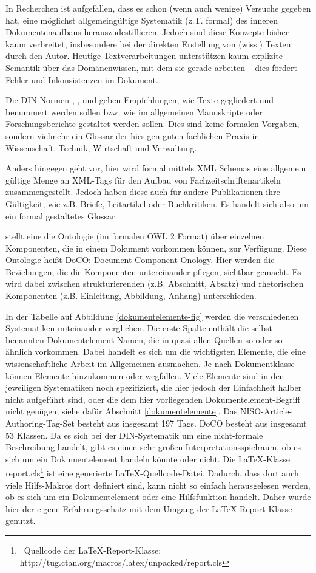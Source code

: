  
In Recherchen ist aufgefallen, dass es schon (wenn auch wenige) Versuche gegeben hat, eine möglichst allgemeingültige Systematik (z.T. formal) des inneren Dokumentenaufbaus herauszudestillieren. Jedoch sind diese Konzepte bisher kaum verbreitet, insbesondere bei der direkten Erstellung von (wiss.) Texten durch den Autor. Heutige Textverarbeitungen unterstützen kaum explizite Semantik über das Domänenwissen, mit dem sie gerade arbeiten -- dies fördert Fehler und Inkonsistenzen im Dokument.

 
Die DIN-Normen \citep{DIN1421}, \citep{DIN1422-1}, \citep{DIN1422-3} und \citep{DIN1422-4} geben Empfehlungen, wie Texte gegliedert und benummert werden sollen bzw. wie im allgemeinen Manuskripte oder Forschungsberichte gestaltet werden sollen. Dies sind keine formalen Vorgaben, sondern vielmehr ein Glossar der hiesigen guten fachlichen Praxis in Wissenschaft, Technik, Wirtschaft und Verwaltung.

 
Anders hingegen geht \citep{NISO} vor, hier wird formal mittels XML Schemas eine allgemein gültige Menge an XML-Tags für den Aufbau von Fachzeitschriftenartikeln zusammengestellt. Jedoch haben diese auch für andere Publikationen ihre Gültigkeit, wie z.B. Briefe, Leitartikel oder Buchkritiken. Es handelt sich also um ein formal gestaltetes Glossar.

 
\citep{Peroni} stellt eine die Ontologie (im formalen OWL 2 Format) über einzelnen Komponenten, die in einem Dokument vorkommen können, zur Verfügung. Diese Ontologie heißt DoCO: Document Component Onology. Hier werden die Beziehungen, die die Komponenten untereinander pflegen, sichtbar gemacht. Es wird dabei zwischen strukturierenden (z.B. Abschnitt, Absatz) und rhetorischen Komponenten (z.B. Einleitung, Abbildung, Anhang) unterschieden.

 
In der Tabelle auf Abbildung \ref{dokumentelemente-fig} werden die verschiedenen Systematiken miteinander verglichen. Die erste Spalte enthält die selbst benannten Dokumentelement-Namen, die in quasi allen Quellen so oder so ähnlich vorkommen. Dabei handelt es sich um die wichtigsten Elemente, die eine wissenschaftliche Arbeit im Allgemeinen ausmachen. Je nach Dokumentklasse können Elemente hinzukommen oder wegfallen. Viele Elemente sind in den jeweiligen Systematiken noch spezifiziert, die hier jedoch der Einfachheit halber nicht aufgeführt sind, oder die dem hier vorliegenden Dokumentelement-Begriff nicht genügen; siehe dafür Abschnitt \ref{dokumentelemente}. Das NISO-Article-Authoring-Tag-Set besteht aus insgesamt 197 Tags. DoCO besteht aus insgesamt 53 Klassen. Da es sich bei der DIN-Systematik um eine nicht-formale Beschreibung handelt, gibt es einen sehr großen Interpretationsspielraum, ob es sich um ein Dokumentelement handeln könnte oder nicht. Die LaTeX-Klasse report.cls\footnote{~Quellcode der LaTeX-Report-Klasse: http://tug.ctan.org/macros/latex/unpacked/report.cls} ist eine generierte LaTeX-Quellcode-Datei. Dadurch, dass dort auch viele Hilfs-Makros dort definiert sind, kann nicht so einfach herausgelesen werden, ob es sich um ein Dokumentelement oder eine Hilfsfunktion handelt. Daher wurde hier der eigene Erfahrungsschatz mit dem Umgang der LaTeX-Report-Klasse genutzt.

